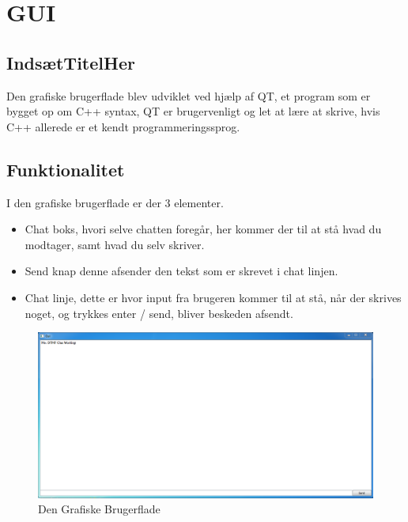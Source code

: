 \section{GUI}

\subsection{IndsætTitelHer}

Den grafiske brugerflade blev udviklet ved hjælp af QT, et program som er bygget op om C++ syntax, QT er brugervenligt og let at lære at skrive, hvis C++ allerede er et kendt programmeringssprog.\\
\subsection{Funktionalitet}

I den grafiske brugerflade er der 3 elementer.
\begin{itemize}
	\item Chat boks, hvori selve chatten foregår, her kommer der til at stå hvad du modtager, samt hvad du selv skriver.
	\item Send knap denne afsender den tekst som er skrevet i chat linjen.
	\item Chat linje, dette er hvor input fra brugeren kommer til at stå, når der skrives noget, og trykkes enter / send, bliver beskeden afsendt.
\end{itemize}

\begin{figure}[h]
	\centering
		\includegraphics[scale=0.5]{Billeder/GUI.PNG}
	\caption{Den Grafiske Brugerflade}
	\label{fig:tidsplan}
\end{figure}